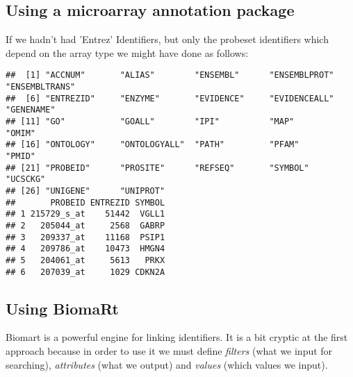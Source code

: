\documentclass{article}\usepackage[]{graphicx}\usepackage[]{color}
\makeatletter
\newenvironment{kframe}{%
 \def\at@end@of@kframe{}%
 \ifinner\ifhmode%
  \def\at@end@of@kframe{\end{minipage}}%
  \begin{minipage}{\columnwidth}%
 \fi\fi%
 \def\FrameCommand##1{\hskip\@totalleftmargin \hskip-\fboxsep
 \colorbox{shadecolor}{##1}\hskip-\fboxsep
     \hskip-\linewidth \hskip-\@totalleftmargin \hskip\columnwidth}%
 \MakeFramed {\advance\hsize-\width
   \@totalleftmargin\z@ \linewidth\hsize
   \@setminipage}}%
 {\par\unskip\endMakeFramed%
 \at@end@of@kframe}
\newenvironment{knitrout}{}{} %
\makeatother
\begin{document}
\subsection{Using a microarray annotation package}

If we hadn't had 'Entrez' Identifiers, but only the probeset identifiers which depend on the array type we might have done as follows:

\begin{knitrout}
\color{fgcolor}\begin{kframe}
\begin{verbatim}
##  [1] "ACCNUM"       "ALIAS"        "ENSEMBL"      "ENSEMBLPROT"  "ENSEMBLTRANS"
##  [6] "ENTREZID"     "ENZYME"       "EVIDENCE"     "EVIDENCEALL"  "GENENAME"    
## [11] "GO"           "GOALL"        "IPI"          "MAP"          "OMIM"        
## [16] "ONTOLOGY"     "ONTOLOGYALL"  "PATH"         "PFAM"         "PMID"        
## [21] "PROBEID"      "PROSITE"      "REFSEQ"       "SYMBOL"       "UCSCKG"      
## [26] "UNIGENE"      "UNIPROT"
##       PROBEID ENTREZID SYMBOL
## 1 215729_s_at    51442  VGLL1
## 2   205044_at     2568  GABRP
## 3   209337_at    11168  PSIP1
## 4   209786_at    10473  HMGN4
## 5   204061_at     5613   PRKX
## 6   207039_at     1029 CDKN2A
\end{verbatim}
\end{kframe}
\end{knitrout}

\subsection{Using BiomaRt}

Biomart is a powerful engine for linking identifiers. 
It is a bit cryptic at the first approach because in order to use it we must define \emph{filters} (what we input for searching), \emph{attributes} (what we output) and \emph{values} (which values we input).
\end{document}
